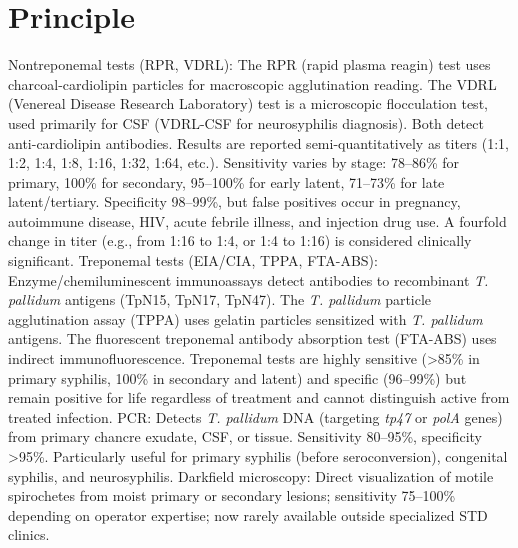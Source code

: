 \section*{Principle}
Nontreponemal tests (RPR, VDRL): The RPR (rapid plasma reagin) test uses charcoal-cardiolipin particles for macroscopic agglutination reading. The VDRL (Venereal Disease Research Laboratory) test is a microscopic flocculation test, used primarily for CSF (VDRL-CSF for neurosyphilis diagnosis). Both detect anti-cardiolipin antibodies. Results are reported semi-quantitatively as titers (1:1, 1:2, 1:4, 1:8, 1:16, 1:32, 1:64, etc.). Sensitivity varies by stage: 78--86\% for primary, 100\% for secondary, 95--100\% for early latent, 71--73\% for late latent/tertiary. Specificity 98--99\%, but false positives occur in pregnancy, autoimmune disease, HIV, acute febrile illness, and injection drug use. A fourfold change in titer (e.g., from 1:16 to 1:4, or 1:4 to 1:16) is considered clinically significant. Treponemal tests (EIA/CIA, TPPA, FTA-ABS): Enzyme/chemiluminescent immunoassays detect antibodies to recombinant \textit{T. pallidum} antigens (TpN15, TpN17, TpN47). The \textit{T. pallidum} particle agglutination assay (TPPA) uses gelatin particles sensitized with \textit{T. pallidum} antigens. The fluorescent treponemal antibody absorption test (FTA-ABS) uses indirect immunofluorescence. Treponemal tests are highly sensitive (>85\% in primary syphilis, 100\% in secondary and latent) and specific (96--99\%) but remain positive for life regardless of treatment and cannot distinguish active from treated infection. PCR: Detects \textit{T. pallidum} DNA (targeting \textit{tp47} or \textit{polA} genes) from primary chancre exudate, CSF, or tissue. Sensitivity 80--95\%, specificity >95\%. Particularly useful for primary syphilis (before seroconversion), congenital syphilis, and neurosyphilis. Darkfield microscopy: Direct visualization of motile spirochetes from moist primary or secondary lesions; sensitivity 75--100\% depending on operator expertise; now rarely available outside specialized STD clinics.

